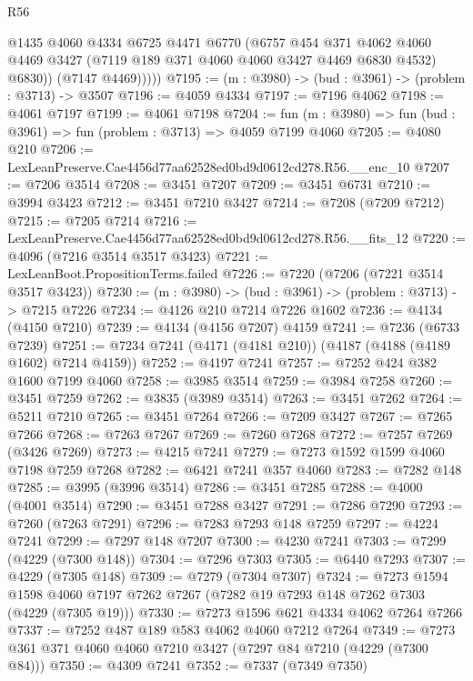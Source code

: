 \begin{lexlean}{R56}
\begin{coremodule}
              @1435
              @4060
              @4334
              @6725
              @4471
              @6770
              (@6757
                @454
                @371
                @4062
                @4060
                @4469
                @3427
                (@7119 @189 @371 @4060 @4060 @3427 @4469 @6830 @4532)
                @6830))
            (@7147 @4469)))))
@7195 := (m : @3980) -> (bud : @3961) -> (problem : @3713) -> @3507
@7196 := @4059 @4334
@7197 := @7196 @4062
@7198 := @4061 @7197
@7199 := @4061 @7198
@7204 := fun (m : @3980) => fun (bud : @3961) => fun (problem : @3713) => @4059 @7199 @4060
@7205 := @4080 @210
@7206 := LexLeanPreserve.Cae4456d77aa62528ed0bd9d0612cd278.R56.__enc_10
@7207 := @7206 @3514
@7208 := @3451 @7207
@7209 := @3451 @6731
@7210 := @3994 @3423
@7212 := @3451 @7210 @3427
@7214 := @7208 (@7209 @7212)
@7215 := @7205 @7214
@7216 := LexLeanPreserve.Cae4456d77aa62528ed0bd9d0612cd278.R56.__fits_12
@7220 := @4096 (@7216 @3514 @3517 @3423)
@7221 := LexLeanBoot.PropositionTerms.failed
@7226 := @7220 (@7206 (@7221 @3514 @3517 @3423))
@7230 := (m : @3980) -> (bud : @3961) -> (problem : @3713) -> @7215 @7226
@7234 := @4126 @210 @7214 @7226 @1602
@7236 := @4134 (@4150 @7210)
@7239 := @4134 (@4156 @7207) @4159
@7241 := @7236 (@6733 @7239)
@7251 := @7234 @7241 (@4171 (@4181 @210)) (@4187 (@4188 (@4189 @1602) @7214 @4159))
@7252 := @4197 @7241
@7257 := @7252 @424 @382 @1600 @7199 @4060
@7258 := @3985 @3514
@7259 := @3984 @7258
@7260 := @3451 @7259
@7262 := @3835 (@3989 @3514)
@7263 := @3451 @7262
@7264 := @5211 @7210
@7265 := @3451 @7264
@7266 := @7209 @3427
@7267 := @7265 @7266
@7268 := @7263 @7267
@7269 := @7260 @7268
@7272 := @7257 @7269 (@3426 @7269)
@7273 := @4215 @7241
@7279 := @7273 @1592 @1599 @4060 @7198 @7259 @7268
@7282 := @6421 @7241 @357 @4060
@7283 := @7282 @148
@7285 := @3995 (@3996 @3514)
@7286 := @3451 @7285
@7288 := @4000 (@4001 @3514)
@7290 := @3451 @7288 @3427
@7291 := @7286 @7290
@7293 := @7260 (@7263 @7291)
@7296 := @7283 @7293 @148 @7259
@7297 := @4224 @7241
@7299 := @7297 @148 @7207
@7300 := @4230 @7241
@7303 := @7299 (@4229 (@7300 @148))
@7304 := @7296 @7303
@7305 := @6440 @7293
@7307 := @4229 (@7305 @148)
@7309 := @7279 (@7304 @7307)
@7324 := @7273
    @1594
    @1598
    @4060
    @7197
    @7262
    @7267
    (@7282 @19 @7293 @148 @7262 @7303 (@4229 (@7305 @19)))
@7330 := @7273 @1596 @621 @4334 @4062 @7264 @7266
@7337 := @7252 @487 @189 @583 @4062 @4060 @7212 @7264
@7349 := @7273 @361 @371 @4060 @4060 @7210 @3427 (@7297 @84 @7210 (@4229 (@7300 @84)))
@7350 := @4309 @7241
@7352 := @7337 (@7349 @7350)

\end{coremodule}
\end{lexlean}
